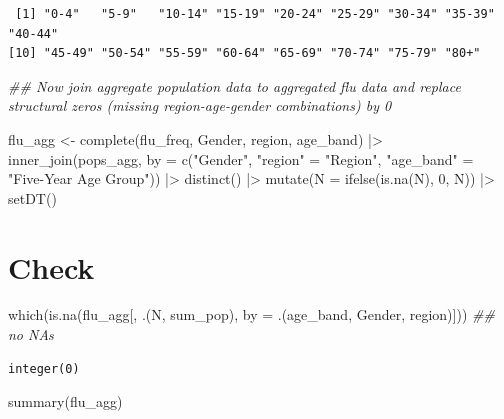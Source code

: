 \documentclass[
  letterpaper,
  DIV=11,
  numbers=noendperiod]{scrreprt}
\newenvironment{Shaded}{\begin{snugshade}}{\end{snugshade}}
\newcommand{\AttributeTok}[1]{\textcolor[rgb]{0.40,0.45,0.13}{#1}}
\newcommand{\DecValTok}[1]{\textcolor[rgb]{0.68,0.00,0.00}{#1}}
\newcommand{\DocumentationTok}[1]{\textcolor[rgb]{0.37,0.37,0.37}{\textit{#1}}}
\newcommand{\FunctionTok}[1]{\textcolor[rgb]{0.28,0.35,0.67}{#1}}
\newcommand{\NormalTok}[1]{\textcolor[rgb]{0.00,0.23,0.31}{#1}}
\newcommand{\OtherTok}[1]{\textcolor[rgb]{0.00,0.23,0.31}{#1}}
\newcommand{\SpecialCharTok}[1]{\textcolor[rgb]{0.37,0.37,0.37}{#1}}
\newcommand{\StringTok}[1]{\textcolor[rgb]{0.13,0.47,0.30}{#1}}
\begin{document}
\begin{verbatim}
 [1] "0-4"   "5-9"   "10-14" "15-19" "20-24" "25-29" "30-34" "35-39" "40-44"
[10] "45-49" "50-54" "55-59" "60-64" "65-69" "70-74" "75-79" "80+"  
\end{verbatim}

\begin{Shaded}
\begin{Highlighting}[]
\DocumentationTok{\#\# Now join aggregate population data to aggregated flu data and replace structural zeros (missing region{-}age{-}gender combinations) by 0}

\NormalTok{flu\_agg }\OtherTok{\textless{}{-}} \FunctionTok{complete}\NormalTok{(flu\_freq, Gender, region, age\_band) }\SpecialCharTok{|\textgreater{}}
    \FunctionTok{inner\_join}\NormalTok{(pops\_agg, }\AttributeTok{by =} \FunctionTok{c}\NormalTok{(}\StringTok{"Gender"}\NormalTok{, }\StringTok{"region"} \OtherTok{=} \StringTok{"Region"}\NormalTok{,  }\StringTok{"age\_band"} \OtherTok{=} \StringTok{"Five{-}Year Age Group"}\NormalTok{)) }\SpecialCharTok{|\textgreater{}}
    \FunctionTok{distinct}\NormalTok{() }\SpecialCharTok{|\textgreater{}}
    \FunctionTok{mutate}\NormalTok{(}\AttributeTok{N =} \FunctionTok{ifelse}\NormalTok{(}\FunctionTok{is.na}\NormalTok{(N), }\DecValTok{0}\NormalTok{, N)) }\SpecialCharTok{|\textgreater{}}
    \FunctionTok{setDT}\NormalTok{()}
\end{Highlighting}
\end{Shaded}

\section{Check}\label{check}

\begin{Shaded}
\begin{Highlighting}[]
\FunctionTok{which}\NormalTok{(}\FunctionTok{is.na}\NormalTok{(flu\_agg[, .(N, sum\_pop),  }\AttributeTok{by =}\NormalTok{ .(age\_band, Gender, region)])) }\DocumentationTok{\#\# no NAs}
\end{Highlighting}
\end{Shaded}

\begin{verbatim}
integer(0)
\end{verbatim}

\begin{Shaded}
\begin{Highlighting}[]
\FunctionTok{summary}\NormalTok{(flu\_agg)}
\end{Highlighting}
\end{Shaded}
\end{document}
